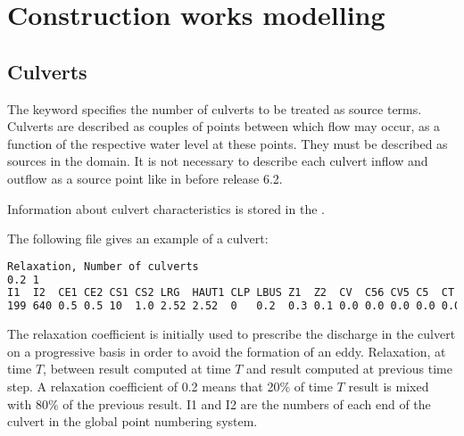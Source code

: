 \chapter{Construction works modelling}
\label{ch:constr:wm}

\section{Culverts}
\label{sec:culverts}
The keyword  specifies the number of culverts to be treated
as source terms.
Culverts are described as couples of points between which flow may occur,
as a function of the respective water level at these points.
They must be described as sources in the domain.
It is not necessary to describe each culvert
inflow and outflow as a source point like in  before release 6.2.

Information about culvert characteristics is stored in the .

The following file gives an example of a culvert:
\begin{lstlisting}[language=bash]
Relaxation, Number of culverts
0.2 1
I1  I2  CE1 CE2 CS1 CS2 LRG  HAUT1 CLP LBUS Z1  Z2  CV  C56 CV5 C5  CT  HAUT2 FRIC LENGTH CIRC D1  D2 A1 A2  AA
199 640 0.5 0.5 10  1.0 2.52 2.52  0   0.2  0.3 0.1 0.0 0.0 0.0 0.0 0.0 2.52  0.0  0.0    1    90. 0. 0. 90. 0

\end{lstlisting}

The relaxation coefficient is initially used to prescribe the discharge
in the culvert on a progressive basis in order to avoid the formation of an eddy.
Relaxation, at time $T$, between result computed at time $T$ and result
computed at previous time step.
A relaxation coefficient of 0.2 means that 20\% of time $T$ result is mixed
with 80\% of the previous result.
I1 and I2 are the numbers of each end of the culvert in the global point numbering system.

